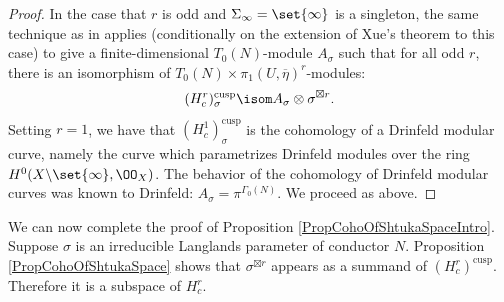 \documentclass{article}
\begin{document}
\begin{proof}
In the case that $r$ is odd and $\Sigma_\infty=\set{\infty}$ is a singleton,
the same technique as in \cite{LafforgueZhu} applies (conditionally on the extension of Xue's theorem to this case) to give a finite-dimensional $T_0(N)$-module $A_\sigma$ such that for all odd $r$, there is an isomorphism of $T_0(N)\times\pi_1(U,\overline{\eta})^r$-modules:
\[ (H^r_c)^{\mathrm{cusp}}_{\sigma}\isom A_\sigma \otimes \sigma^{\boxtimes r}. \]
Setting $r=1$, we have that $(H^1_c)^{\mathrm{cusp}}_{\sigma}$ is the cohomology of a Drinfeld modular curve, namely the curve which parametrizes Drinfeld modules over the ring $H^0(X\backslash \set{\infty},\OO_X)$.   
The behavior of the cohomology of Drinfeld modular curves was known to Drinfeld:  $A_\sigma=\pi^{\Gamma_0(N)}$.  
We proceed as above.
 \end{proof}
 
We can now complete the proof of Proposition \ref{PropCohoOfShtukaSpaceIntro}.  Suppose $\sigma$ is an irreducible Langlands parameter of conductor $N$.  Proposition \ref{PropCohoOfShtukaSpace} shows that $\sigma^{\boxtimes r}$ appears as a summand of $(H^r_c)^{\mathrm{cusp}}$.  Therefore it is a subspace of $H^r_c$.  


\end{document}

